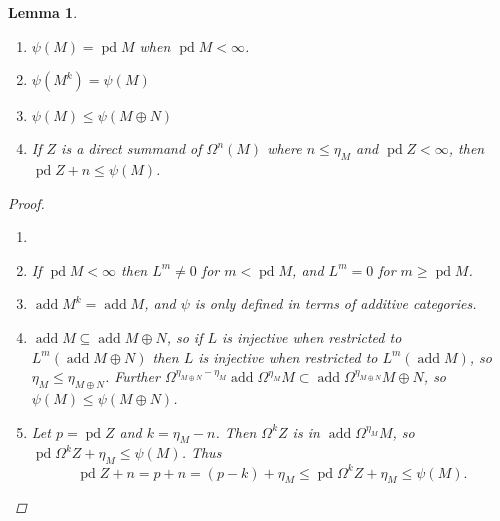 \documentclass[11pt, a4paper, english]{article}
\newtheorem{lemma}[theorem]{Lemma}
\theoremstyle{definition}
\DeclareMathOperator{\pd}{pd}
\DeclareMathOperator{\add}{add}
\begin{document}
\begin{lemma} \cite[Lemma~3]{IgTo05} \label{lem:properties_of_psi}
	\begin{enumerate}
		\item $\psi(M) = \pd M$ when $\pd M < \infty$.
		\item $\psi(M^k) = \psi(M)$
		\item $\psi(M) \leq \psi(M\oplus N)$
		\item If $Z$ is a direct summand of $\Omega^n(M)$ where $n \leq \eta_M$ and $\pd Z < \infty$, then $\pd Z + n \leq \psi(M)$.
	\end{enumerate}
	\begin{proof}
		\begin{enumerate}
			\item[] %
			\item If $\pd M < \infty$ then $L^m \neq 0$ for $m < \pd M$, and $L^m =0$ for $m \geq \pd M$.
			\item $\add M^k = \add M$, and $\psi$ is only defined in terms of additive categories.
			\item  $\add M \subseteq \add M\oplus N$, so if $L$ is injective when restricted to $L^m(\add M\oplus N)$ then $L$ is injective when restricted to $L^m(\add M)$, so $\eta_M \leq \eta_{M\oplus N}$. Further $\Omega^{\eta_{M\oplus N}-\eta_M}\add\Omega^{\eta_M}M \subset \add\Omega^{\eta_{M\oplus N}} M\oplus N$, so $\psi(M) \leq \psi(M\oplus N)$.
			\item Let $p=\pd Z$ and $k = \eta_M - n$. Then $\Omega^k Z$ is in $\add \Omega^{\eta_M}M$, so $\pd\Omega^k Z + \eta_M \leq \psi(M)$. Thus $$\pd Z + n = p + n = (p-k) + \eta_M \leq \pd\Omega^k Z + \eta_M \leq \psi(M).$$
		\end{enumerate}
	\end{proof}
\end{lemma}
\end{document}
